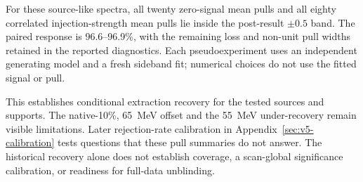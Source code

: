 For these source-like spectra, all twenty zero-signal mean pulls and
all eighty correlated injection-strength mean pulls lie inside the
post-result $\pm0.5$ band. The paired response is 96.6--96.9\%,
with the remaining loss and non-unit pull widths retained in the
reported diagnostics. Each pseudoexperiment uses an independent
generating model and a fresh sideband fit; numerical choices do not
use the fitted signal or pull.

This establishes conditional extraction recovery for the tested
sources and supports. The native-10\%, 65~MeV offset and the
55~MeV under-recovery remain visible limitations. Later rejection-rate
calibration in Appendix~\ref{sec:v5-calibration} tests questions that
these pull summaries do not answer. The historical recovery alone
does not establish coverage, a scan-global significance calibration,
or readiness for full-data unblinding.
